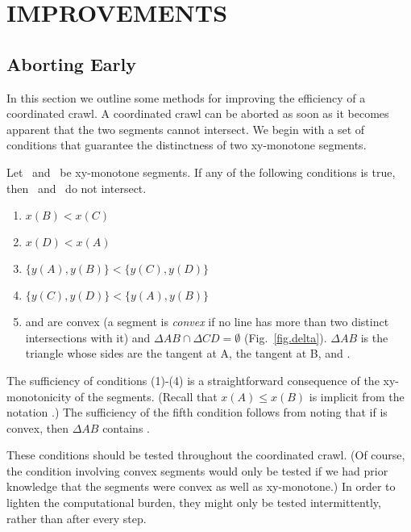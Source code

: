 \section{IMPROVEMENTS}
\label{sec.improve}

\subsection{Aborting Early}

In this section we outline some methods for improving the efficiency of a 
coordinated crawl.
A coordinated crawl can be aborted as soon as it becomes apparent that the two 
segments cannot intersect.
We begin with a set of conditions that guarantee the distinctness of two 
xy-monotone segments.

\begin{lemma}
\label{lem-badconds}
Let \ and \ be xy-monotone segments.
If any of the following conditions is true, then \ and \ do not
intersect.  
\begin{enumerate}
	\item $x(B) < x(C)$
	\item $x(D) < x(A)$
	\item $\{y(A),y(B)\} < \{y(C),y(D)\}$
	\item $\{y(C),y(D)\} < \{y(A),y(B)\}$
	\item {} and  are convex (a segment is {\em convex} if
			no line has more than two distinct intersections with it)
	    	and $\Delta AB \cap \Delta CD = \emptyset$ (Fig.~\ref{fig.delta}).
	$\Delta AB$ is the triangle whose sides are the tangent at 
	A, the tangent at B, and .
\end{enumerate}
\end{lemma}
%
The sufficiency of conditions (1)-(4) is a straightforward consequence of the 
xy-monotonicity of the segments.
(Recall that $x(A) \leq x(B)$ is implicit 
	from the notation .)
The sufficiency of the fifth condition follows from noting that
if  is convex, then $\Delta AB$ contains .
\QED


These conditions should be tested throughout the coordinated crawl.
(Of course, the condition involving convex segments would only be tested if we had
prior knowledge that the segments were convex as well as xy-monotone.)
In order to lighten the computational burden, they might only be tested intermittently, 
rather than after every step.

